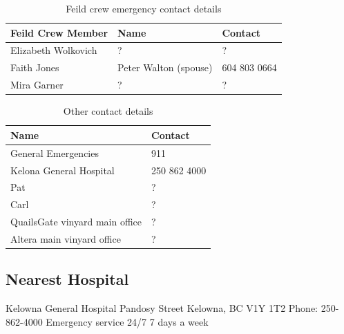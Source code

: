 \documentclass[11pt,letter]{article}
\begin{document}
\begin{table}[H]
\caption{Feild crew emergency contact details} %
\begin{tabular}{l l l} %
\hline\hline %
Feild Crew Member & Name & Contact\\ [0.5ex] %
\hline %
Elizabeth Wolkovich & ? & ? \\ %
Faith Jones & Peter Walton (spouse) & 604 803 0664\\
Mira Garner & ? & ? \\
\hline %
\end{tabular}
\label{table:nonlin} %
\end{table}

\begin{table}[H]
\caption{Other contact details} %
\begin{tabular}{l l} %
\hline\hline %
Name & Contact \\ [0.5ex] %
\hline %
General Emergencies & 911 \\ %
Kelona General Hospital & 250 862 4000 \\
Pat & ?\\
Carl & ?\\
QuailsGate vinyard main office & ? \\
Altera main vinyard office & ? \\

\hline %
\end{tabular}
\label{table:nonlin} %
\end{table}

\subsection {Nearest Hospital}
Kelowna General Hospital  Pandosy Street\newline
Kelowna, BC V1Y 1T2\newline
Phone: 250-862-4000\newline
Emergency service 24/7 7 days a week
\end{document}
